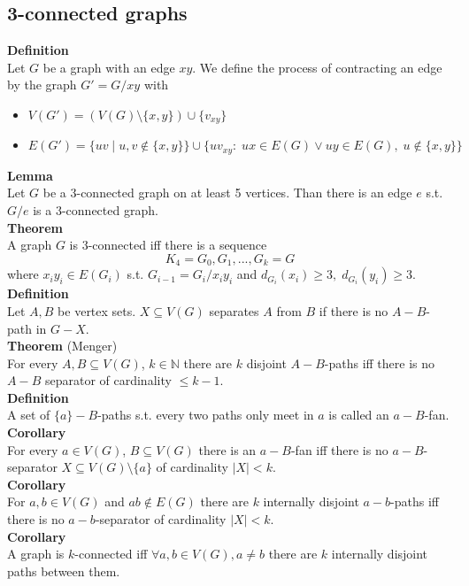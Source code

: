 \documentclass[a4paper, 12pt]{article}
\begin{document}
	\subsection{3-connected graphs}
	\textbf{Definition}\\
	Let $G$ be a graph with an edge $xy$. We define the process of contracting an edge by the graph $G' = G/xy$ with \begin{itemize}
		\item $V(G') = (V(G)\setminus \{x,y\})\cup \{v_{xy}\}$
		\item $E(G') = \{uv \; | \; u,v \notin \{x,y\}\} \cup \{uv_{xy}: \; ux \in E(G) \lor uy \in E(G), \; u \notin \{x,y\}\}$
	\end{itemize}
	\textbf{Lemma}\\
	Let $G$ be a $3$-connected graph on at least 5 vertices. Than there is an edge $e$ s.t. $G/e$ is a $3$-connected graph.\\
	\textbf{Theorem}\\
	A graph $G$ is $3$-connected iff there is a sequence \[K_4 = G_0, G_1,...,G_k = G\] 
	where $x_iy_i \in E(G_i)$ s.t. $G_{i-1} = G_i/x_iy_i$ and $d_{G_i}(x_i) \geq 3, \; d_{G_i}(y_i) \geq 3$.\\
	\textbf{Definition}\\
	Let $A,B$ be vertex sets. $X \subseteq V(G)$ separates $A$ from $B$ if there is no $A-B$-path in $G-X$.\\
	\textbf{Theorem} (Menger)\\
	For every $A,B \subseteq V(G)$, $k \in \mathbb{N}$ there are $k$ disjoint $A-B$-paths iff there is no $A-B$ separator of cardinality $\leq k-1$.\\
	\textbf{Definition}\\
	A set of $\{a\}-B$-paths s.t. every two paths only meet in $a$ is called an $a-B$-fan.\\
	\textbf{Corollary}\\
	For every $a \in V(G)$, $B\subseteq V(G)$ there is an $a-B$-fan iff there is no $a-B$-separator $X \subseteq V(G)\setminus \{a\}$ of cardinality $\left|X\right|<k$.\\
	\textbf{Corollary}\\
	For $a,b \in V(G)$ and $ab \notin E(G)$ there are $k$ internally disjoint $a-b$-paths iff there is no $a-b$-separator of cardinality $\left|X\right|<k$.\\
	\textbf{Corollary}\\
	A graph is $k$-connected iff $\forall a,b \in V(G), a\neq b$ there are $k$ internally disjoint paths between them.\\
\end{document}
